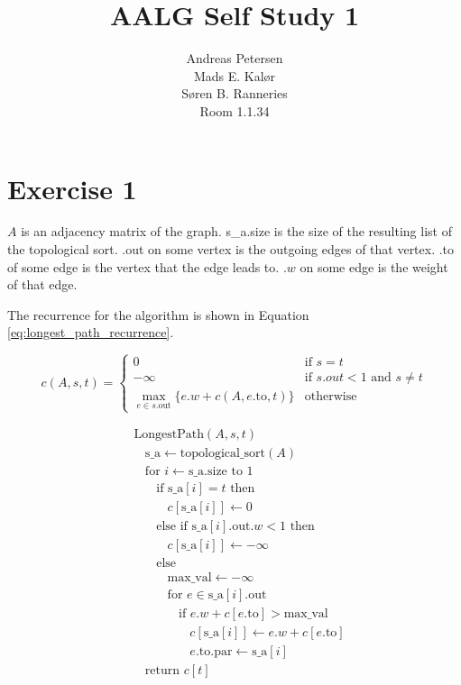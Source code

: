 \documentclass[koma,a4paper]{article}
\title{AALG Self Study 1}
\author{Andreas Petersen\\
Mads E. Kalør\\
Søren B. Ranneries\\
Room 1.1.34}
\begin{document}
\maketitle

\pagebreak

\section{Exercise 1}
$A$ is an adjacency matrix of the graph. s\_a.size is the size of the resulting list of the topological sort. .out on some vertex is the outgoing edges of that vertex. .to of some edge is the vertex that the edge leads to. $.w$ on some edge is the weight of that edge.

The recurrence for the algorithm is shown in Equation \ref{eq:longest_path_recurrence}.

\begin{equation}
  c(A, s, t) = \begin{cases}
    0 &\text{if } s = t \\
    -\infty &\text{if } s.out < 1 \text{ and } s \neq t \\
    \max\limits_{e \in s.\text{out}} \{ e.w + c(A, e.\text{to}, t) \} &\text{otherwise}
  \end{cases}
  \label{eq:longest_path_recurrence}
\end{equation}

\begin{align*}
  &\text{LongestPath}(A, s, t)\\
  &~~~~\text{s\_a} \leftarrow \text{topological\_sort}(A)\\
  &~~~~\text{for } i \leftarrow \text{s\_a}.\text{size to } 1\\
  &~~~~~~~~\text{if } \text{s\_a}[i] = t \text{ then}\\
  &~~~~~~~~~~~~c[\text{s\_a}[i]] \leftarrow 0\\
  &~~~~~~~~\text{else if } \text{s\_a}[i].\text{out}.w < 1 \text{ then}\\
  &~~~~~~~~~~~~c[\text{s\_a}[i]] \leftarrow - \infty \\
  &~~~~~~~~\text{else }\\
  &~~~~~~~~~~~~\text{max\_val} \leftarrow - \infty \\
  &~~~~~~~~~~~~\text{for } e \in \text{s\_a}[i].\text{out} \\
  &~~~~~~~~~~~~~~~~\text{if } e.w + c[e.\text{to}] > \text{max\_val} \\
  &~~~~~~~~~~~~~~~~~~~~c[\text{s\_a}[i]] \leftarrow e.w + c[e.\text{to}]\\
  &~~~~~~~~~~~~~~~~~~~~e.\text{to}.\text{par} \leftarrow \text{s\_a}[i] \\
  &~~~~\text{return } c[t]
\end{align*}
\end{document}
